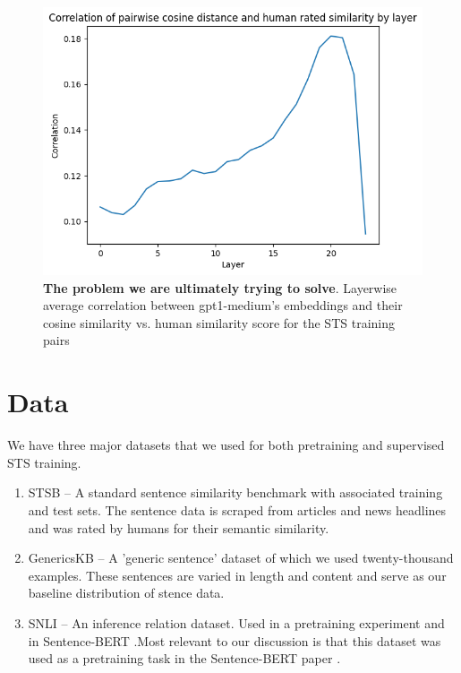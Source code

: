 \documentclass{article}
\begin{document}
\begin{figure}[!htb]
    \centering
    \includegraphics[width=0.65\linewidth]{raw_cosine_sim.png}
    \caption{\textbf{The problem we are ultimately trying to solve}. Layerwise average correlation between gpt1-medium's embeddings and their cosine similarity vs. human similarity score for the STS training pairs}
    \label{fig:raw-corr}
\end{figure}    


\section{Data}
We have three major datasets that we used for both pretraining and supervised STS training.
\begin{enumerate}
    \item STSB \cite{STS} -- A standard sentence similarity benchmark with associated training and test sets. The sentence data is scraped from articles and news headlines and was rated by humans for their semantic similarity.

    \item GenericsKB \cite{bhakthavatsalam2020genericskbknowledgebasegeneric} -- A 'generic sentence' dataset of which we used twenty-thousand examples. These sentences are varied in length and content and serve as our baseline distribution of stence data.

    \item SNLI \cite{snli} -- An inference relation dataset. Used in a pretraining experiment and in Sentence-BERT \cite{reimers2019sentencebertsentenceembeddingsusing}.Most relevant to our discussion is that this dataset was used as a pretraining task in the Sentence-BERT paper \cite{reimers2019sentencebertsentenceembeddingsusing}.
\end{enumerate}
\end{document}
